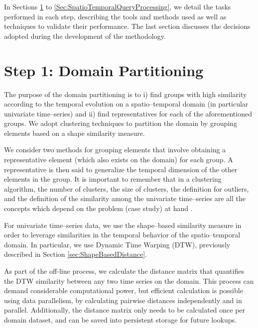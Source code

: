 In Sections \ref{Sec:DomainPartitioning} to \ref{Sec:SpatioTemporalQueryProcessing}, we detail the tasks performed in each step, describing the tools and methods used as well as techniques to validate their performance. The last section discusses the decisions adopted during the development of the methodology.

\section{Step 1: Domain Partitioning}
\label{Sec:DomainPartitioning}

The purpose of the domain partitioning is to i) find groups with high similarity according to the temporal evolution on a spatio--temporal domain (in particular univariate time--series) and ii) find representatives for each of the aforementioned groups. We adopt clustering techniques to partition the domain by grouping elements based on a shape similarity measure. 

We consider two methods for grouping elements that involve obtaining a representative element (which also exists on the domain) for each group. A representative is then said to generalize the temporal dimension of the other elements in the group. It is important to remember that in a clustering algorithm, the number of clusters, the size of clusters, the definition for outliers, and the definition of the similarity among the univariate time--series are all the concepts which depend on the problem (case study) at hand \cite{Aghabozorgi2015}.

For univariate time--series data, we use the shape--based similarity measure in order to leverage similarities in the temporal behavior of the spatio--temporal domain. In particular, we use Dynamic Time Warping (DTW), previously described in Section \ref{sec:ShapeBasedDistance}.

As part of the off-line process, we calculate the distance matrix that quantifies the DTW similarity between any two time series on the domain. This process can demand considerable computational power, but efficient calculation is possible using data parallelism, by calculating pairwise distances independently and in parallel. Additionally, the distance matrix only needs to be calculated once per domain dataset, and can be saved into persistent storage for future lookups.

